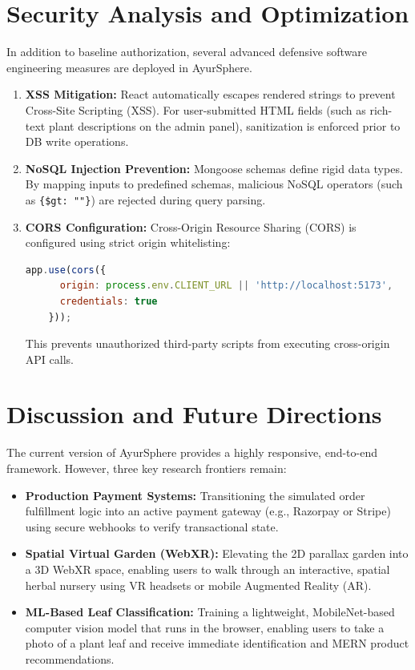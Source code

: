 \documentclass[conference]{IEEEtran}
\begin{document}
\section{Security Analysis and Optimization}
In addition to baseline authorization, several advanced defensive software engineering measures are deployed in AyurSphere.
\begin{enumerate}
    \item \textbf{XSS Mitigation:} React automatically escapes rendered strings to prevent Cross-Site Scripting (XSS). For user-submitted HTML fields (such as rich-text plant descriptions on the admin panel), sanitization is enforced prior to DB write operations.
    \item \textbf{NoSQL Injection Prevention:} Mongoose schemas define rigid data types. By mapping inputs to predefined schemas, malicious NoSQL operators (such as \texttt{\{\$gt: ""\}}) are rejected during query parsing.
    \item \textbf{CORS Configuration:} Cross-Origin Resource Sharing (CORS) is configured using strict origin whitelisting:
    \begin{lstlisting}[language=JavaScript]
    app.use(cors({
      origin: process.env.CLIENT_URL || 'http://localhost:5173',
      credentials: true
    }));
    \end{lstlisting}
    This prevents unauthorized third-party scripts from executing cross-origin API calls.
\end{enumerate}

\section{Discussion and Future Directions}
The current version of AyurSphere provides a highly responsive, end-to-end framework. However, three key research frontiers remain:
\begin{itemize}
    \item \textbf{Production Payment Systems:} Transitioning the simulated order fulfillment logic into an active payment gateway (e.g., Razorpay or Stripe) using secure webhooks to verify transactional state.
    \item \textbf{Spatial Virtual Garden (WebXR):} Elevating the 2D parallax garden into a 3D WebXR space, enabling users to walk through an interactive, spatial herbal nursery using VR headsets or mobile Augmented Reality (AR).
    \item \textbf{ML-Based Leaf Classification:} Training a lightweight, MobileNet-based computer vision model that runs in the browser, enabling users to take a photo of a plant leaf and receive immediate identification and MERN product recommendations.
\end{itemize}
\end{document}
